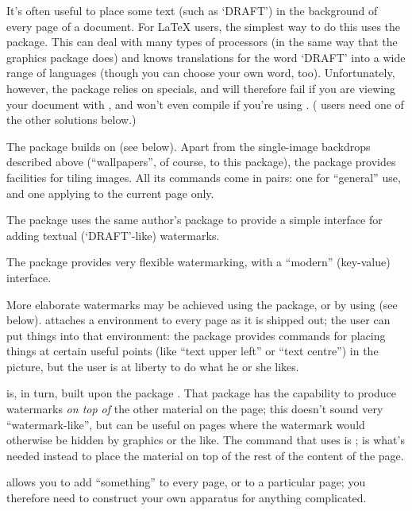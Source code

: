 It's often useful to place some text (such as `DRAFT') in the
background of every page of a document.  For \LaTeX{} users, the
simplest way to do this uses the  package.  This
can deal with
many types of  processors (in the same way that the graphics
package does) and knows translations for the word `DRAFT' into a wide
range of languages (though you can choose your own word, too).
Unfortunately, however, the package relies on \PS{} specials, and will
therefore fail if you are viewing your document with ,
and won't even compile if you're using \PDFLaTeX{}.  (\PDFLaTeX{}
users need one of the other solutions below.)

The  package builds on  (see
below).  Apart from the single-image backdrops described above
(``wallpapers'', of course, to this package), the package provides
facilities for tiling images.  All its commands come in pairs: one for
``general'' use, and one applying to the current page only.

The  package uses the same author's
 package to provide a simple interface for adding
textual (`DRAFT'-like) watermarks.

The  package provides very flexible watermarking,
with a ``modern'' (key-value) interface.

More elaborate watermarks may be achieved using the 
package, or by using  (see below).
 attaches a  environment to
every page as it is shipped out; the user can put things into that
environment: the package provides commands for placing things at
certain useful points (like ``text upper left'' or ``text centre'') in
the picture, but the user is at liberty to do what he or she likes.

 is, in turn, built upon the package
.  That package has the capability to produce
watermarks \emph{on top of} the other material on the page; this
doesn't sound very ``watermark-like'', but can be useful on pages
where the watermark would otherwise be hidden by graphics or the
like.  The  command that  uses is
; 
is what's needed instead to place the material on top of the rest of
the content of the page.

 allows you to add ``something'' to every page, or
to a particular page; you therefore need to construct your own
apparatus for anything complicated.

